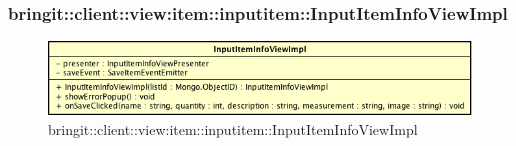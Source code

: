 \subsubsection{bringit::client::view:item::inputitem::InputItemInfoViewImpl}

\label{bringit::client::view:item::inputitem::InputItemInfoViewImpl}
\begin{figure}[H]
	\centering
	\includegraphics[scale=0.5]{Sezioni/SottosezioniST/img/app/InputItemInfoViewImpl.png}
	\caption{bringit::client::view:item::inputitem::InputItemInfoViewImpl}
\end{figure}

